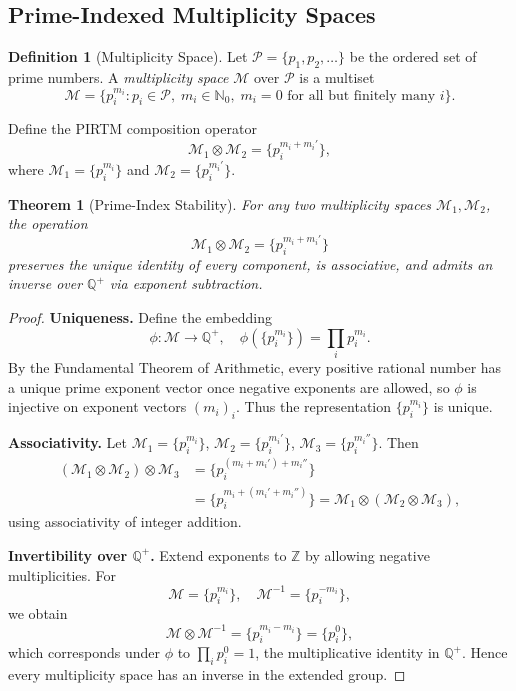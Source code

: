 \documentclass[12pt,letterpaper]{article}
\theoremstyle{definition}
\newtheorem{definition}{Definition}[section]
\theoremstyle{plain}
\newtheorem{theorem}{Theorem}[section]
\theoremstyle{remark}
\begin{document}
\subsection{Prime-Indexed Multiplicity Spaces}
\label{subsec:mult-spaces}

\begin{definition}[Multiplicity Space]
Let \(\mathcal{P} = \{p_1, p_2, \ldots\}\) be the ordered set of prime numbers. A \emph{multiplicity space} \(\mathcal{M}\) over \(\mathcal{P}\) is a multiset
\[
\mathcal{M} = \{p_i^{m_i} : p_i \in \mathcal{P},\; m_i \in \mathbb{N}_0,\; m_i = 0 \text{ for all but finitely many } i\}.
\]
\end{definition}

Define the PIRTM composition operator
\[
\mathcal{M}_1 \otimes \mathcal{M}_2 = \{p_i^{m_i + m_i'}\},
\]
where \(\mathcal{M}_1 = \{p_i^{m_i}\}\) and \(\mathcal{M}_2 = \{p_i^{m_i'}\}\).

\begin{theorem}[Prime-Index Stability]
For any two multiplicity spaces \(\mathcal{M}_1, \mathcal{M}_2\), the operation
\[
\mathcal{M}_1 \otimes \mathcal{M}_2 = \{p_i^{m_i + m_i'}\}
\]
preserves the unique identity of every component, is associative, and admits an inverse over \(\mathbb{Q}^+\) via exponent subtraction.
\end{theorem}

\begin{proof}
\textbf{Uniqueness.} Define the embedding
\[
\phi : \mathcal{M} \to \mathbb{Q}^+, \quad \phi(\{p_i^{m_i}\}) = \prod_i p_i^{m_i}.
\]
By the Fundamental Theorem of Arithmetic, every positive rational number has a unique prime exponent vector once negative exponents are allowed, so \(\phi\) is injective on exponent vectors \((m_i)_i\). Thus the representation \(\{p_i^{m_i}\}\) is unique.

\textbf{Associativity.} Let \(\mathcal{M}_1 = \{p_i^{m_i}\}\), \(\mathcal{M}_2 = \{p_i^{m_i'}\}\), \(\mathcal{M}_3 = \{p_i^{m_i''}\}\). Then
\begin{align*}
(\mathcal{M}_1 \otimes \mathcal{M}_2) \otimes \mathcal{M}_3
  &= \{p_i^{(m_i + m_i') + m_i''}\} \\
  &= \{p_i^{m_i + (m_i' + m_i'')}\}
   = \mathcal{M}_1 \otimes (\mathcal{M}_2 \otimes \mathcal{M}_3),
\end{align*}
using associativity of integer addition.

\textbf{Invertibility over \(\mathbb{Q}^+\).} Extend exponents to \(\mathbb{Z}\) by allowing negative multiplicities. For
\[
\mathcal{M} = \{p_i^{m_i}\}, \quad \mathcal{M}^{-1} = \{p_i^{-m_i}\},
\]
we obtain
\[
\mathcal{M} \otimes \mathcal{M}^{-1} = \{p_i^{m_i - m_i}\} = \{p_i^0\},
\]
which corresponds under \(\phi\) to \(\prod_i p_i^0 = 1\), the multiplicative identity in \(\mathbb{Q}^+\). Hence every multiplicity space has an inverse in the extended group.
\end{proof}
\end{document}
